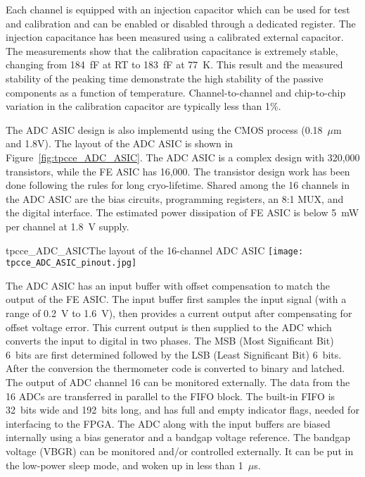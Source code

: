 Each channel is equipped with an injection capacitor which can be used
for test and calibration and can be enabled or disabled through a
dedicated register. The injection capacitance has been measured using 
a calibrated external capacitor. The measurements show
that the calibration capacitance is extremely stable, changing from
184~fF at RT to 183~fF at 77~K. This result and the measured
stability of the peaking time demonstrate the high stability of the
passive components as a function of temperature. Channel-to-channel and chip-to-chip
variation in the calibration capacitor are typically less than 1\%. 

The ADC ASIC design is also implementd using the CMOS process (0.18~$\mu$m and 1.8V).
The layout of the ADC ASIC is shown in Figure~\ref{fig:tpcce_ADC_ASIC}. 
The ADC ASIC is a complex design with 320,000 transistors, while the FE ASIC has 16,000.
The transistor design work has been done following the rules for long cryo-lifetime.
Shared among the 16 channels in the ADC ASIC are the bias circuits, programming registers,
an 8:1 MUX, and the digital interface.
The estimated power dissipation of FE ASIC is below 5~mW per channel at 1.8~V supply.
  

\begin{cdrfigure}{tpcce_ADC_ASIC}{The layout of the 16-channel ADC ASIC}
\texttt{[image: tpcce\_ADC\_ASIC\_pinout.jpg]} %
\end{cdrfigure}

The ADC ASIC has an input buffer with offset compensation to match the output of the FE ASIC.
The input buffer first samples the input signal (with a range of 0.2~V to 1.6~V),
then provides a current output after compensating for offset voltage error.
This current output is then supplied to the ADC which converts the input to digital in two phases.
The MSB (Most Significant Bit) 6~bits are first determined followed by the LSB (Least Significant Bit) 6~bits.
After the conversion the thermometer code is converted to binary and latched.
The output of ADC channel 16 can be monitored externally.
The data from the 16 ADCs are transferred in parallel to the FIFO block.
The built-in FIFO is 32~bits wide and 192~bits long,
and has full and empty indicator flags, needed for interfacing to the FPGA.
The ADC along with the input buffers are biased internally using a bias generator and a bandgap voltage reference.
The bandgap voltage (VBGR) can be monitored and/or controlled externally.
It can be put in the low-power sleep mode, and woken up in less than 1~$\mu$s.

